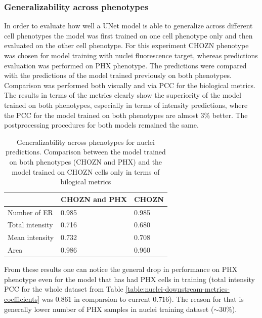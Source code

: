     \subsubsection{Generalizability across phenotypes}
        \label{section:generalizability-across-phenotypes}
        In order to evaluate how well a UNet model is able to generalize across different cell phenotypes the model was first trained on one cell phenotype only and then evaluated on the other cell phenotype. For this experiment CHOZN phenotype was chosen for model training with nuclei fluorescence target, whereas predictions evaluation was performed on PHX phenotype. The predictions were compared with the predictions of the model trained previously on both phenotypes. Comparison was performed both visually and via PCC for the biological metrics. The results in terms of the metrics clearly show the superiority of the model trained on both phenotypes, especially in terms of intensity predictions, where the PCC for the model trained on both phenotypes are almost $3\%$ better. The postprocessing procedures for both models remained the same.

        \begin{table}[H]
            \centering
                \begin{tabularx}{\linewidth}{|Y|YY|}
                    \hline
                    & CHOZN and PHX & CHOZN \\\hline\hline
                    Number of ER & 0.985 & 0.985 \\\hline
                    Total intensity& 0.716 & 0.680\\\hline
                    Mean intensity & 0.732 & 0.708\\\hline
                    Area & 0.986 & 0.960 \\\hline
                \end{tabularx}
                \caption[Generalizability across phenotypes for nuclei predictions]%
                {Generalizability across phenotypes for nuclei predictions. Comparison between the model trained on both phenotypes (CHOZN and PHX) and the model trained on CHOZN cells only in terms of bilogical metrics}
                \label{table:phenotype-generalizability}
        \end{table}
        
        From these results one can notice the general drop in performance on PHX phenotype even for the model that has had PHX cells in training (total intensity PCC for the whole dataset from Table \ref{table:nuclei-downstream-metrics-coefficients} was $0.861$ in comparsion to current $0.716$). The reason for that is generally lower number of PHX samples in nuclei training dataset ($\sim 30\%$).

